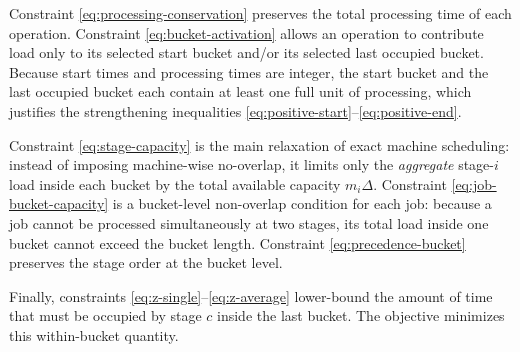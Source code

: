 \documentclass[11pt]{article}
\newcommand{\kbc}[1]{\textcolor{red}{#1}}
\newcommand{\yjc}[1]{\textcolor{blue}{#1}}
\begin{document}
Constraint \eqref{eq:processing-conservation} preserves the total processing time of each operation.
Constraint \eqref{eq:bucket-activation} allows an operation to contribute load only to its selected start bucket and/or its selected last occupied bucket.
Because start times and processing times are integer, the start bucket and the last occupied bucket each contain at least one full unit of processing, which justifies the strengthening inequalities \eqref{eq:positive-start}--\eqref{eq:positive-end}.

Constraint \eqref{eq:stage-capacity} is the main relaxation of exact machine scheduling: instead of imposing machine-wise no-overlap, it limits only the \emph{aggregate} stage-$i$ load inside each bucket by the total available capacity $m_i\Delta$.
Constraint \eqref{eq:job-bucket-capacity} is a bucket-level non-overlap condition for each job: because a job cannot be processed simultaneously at two stages, its total load inside one bucket cannot exceed the bucket length.
Constraint \eqref{eq:precedence-bucket} preserves the stage order at the bucket level.

Finally, constraints \eqref{eq:z-single}--\eqref{eq:z-average} lower-bound the amount of time that must be occupied by stage $c$ inside the last bucket.
The objective minimizes this within-bucket quantity.




\end{document}
